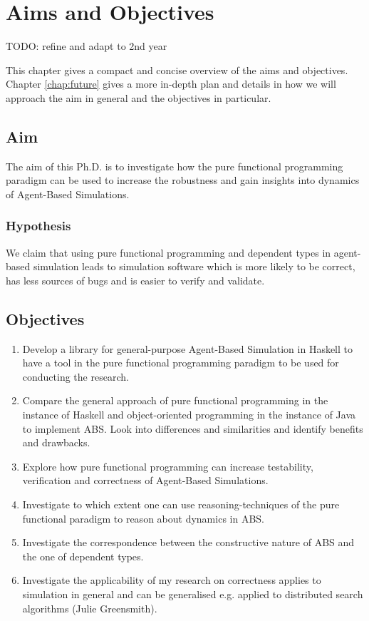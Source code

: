 \chapter{Aims and Objectives}
\label{chap:aimsObj}

TODO: refine and adapt to 2nd year

This chapter gives a compact and concise overview of the aims and objectives. Chapter \ref{chap:future} gives a more in-depth plan and details in how we will approach the aim in general and the objectives in particular.

\section{Aim}
The aim of this Ph.D. is to investigate how the pure functional programming paradigm can be used to increase the robustness and gain insights into dynamics of Agent-Based Simulations.

\subsection{Hypothesis}
We claim that using pure functional programming and dependent types in agent-based simulation leads to simulation software which is more likely to be correct, has less sources of bugs and is easier to verify and validate.

\section{Objectives}
\begin{enumerate}
	\item Develop a library for general-purpose Agent-Based Simulation in Haskell to have a tool in the pure functional programming paradigm to be used for conducting the research.

	\item Compare the general approach of pure functional programming in the instance of Haskell and object-oriented programming in the instance of Java to implement ABS. Look into differences and similarities and identify benefits and drawbacks.

	\item Explore how pure functional programming can increase testability, verification and correctness of Agent-Based Simulations.

	\item Investigate to which extent one can use reasoning-techniques of the pure functional paradigm to reason about dynamics in ABS.
	
	\item Investigate the correspondence between the constructive nature of ABS and the one of dependent types.
	
	\item Investigate the applicability of my research on correctness applies to simulation in general and can be generalised e.g. applied to distributed search algorithms (Julie Greensmith).
\end{enumerate}